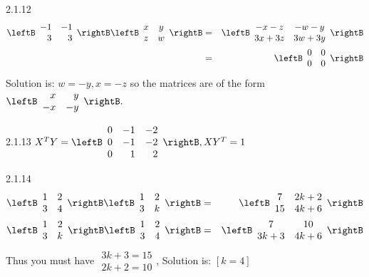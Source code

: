 \begin{Answer}{2.1.12}
\begin{eqnarray*}
\leftB
\begin{array}{rr}
-1 & -1 \\
3 & 3
\end{array}
\rightB \leftB
\begin{array}{cc}
x & y \\
z & w
\end{array}
\rightB  &=&\leftB
\begin{array}{cc}
-x-z & -w-y \\
3x+3z & 3w+3y
\end{array}
\rightB  \\
&=&\leftB
\begin{array}{cc}
0 & 0 \\
0 & 0
\end{array}
\rightB
\end{eqnarray*}
Solution is: $ w=-y,x=-z $ so the
matrices are of the form $\leftB
\begin{array}{rr}
x & y \\
-x & -y
\end{array}
\rightB.$
\end{Answer}
\begin{Answer}{2.1.13}
$X^{T}Y = \leftB \begin{array}{rrr}
0 & -1 & -2 \\
0 & -1 & -2 \\
0 & 1 & 2
\end{array}
\rightB , XY^{T} = 1$
\end{Answer}
\begin{Answer}{2.1.14}
\begin{eqnarray*}
\leftB
\begin{array}{cc}
1 & 2 \\
3 & 4
\end{array}
\rightB \leftB
\begin{array}{cc}
1 & 2 \\
3 & k
\end{array}
\rightB &=& \leftB
\begin{array}{cc}
7 & 2k+2 \\
15 & 4k+6
\end{array}
\rightB \\
 \leftB
\begin{array}{cc}
1 & 2 \\
3 & k
\end{array}
\rightB \leftB
\begin{array}{cc}
1 & 2 \\
3 & 4
\end{array}
\rightB &=& \leftB
\begin{array}{cc}
7 & 10 \\
3k+3 & 4k+6
\end{array}
\rightB
\end{eqnarray*}
 Thus you must have $
\begin{array}{c}
3k+3=15 \\
2k+2=10
\end{array}
$, Solution is: $\left[ k=4\right] $
\end{Answer}
